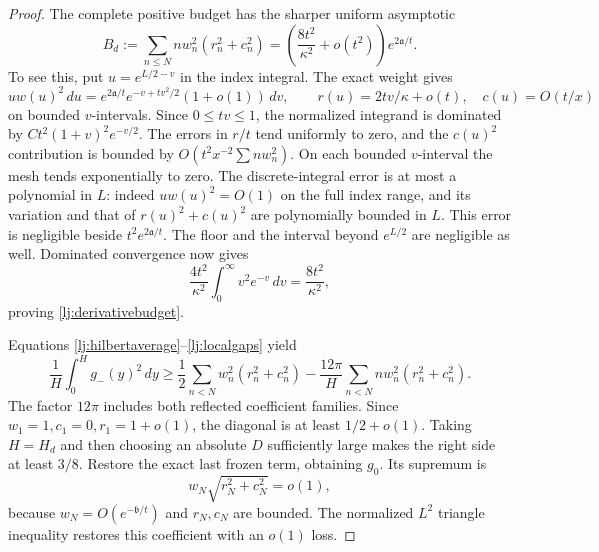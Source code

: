 \documentclass[11pt]{article}
\numberwithin{equation}{section}
\theoremstyle{definition}
\theoremstyle{remark}
\newcommand{\dd}{\,d}
\begin{document}
\begin{proof}
The complete positive budget has the sharper uniform asymptotic
\begin{equation}\label{lj:derivativebudget}
 B_d:=\sum_{n\le N}nw_n^2(r_n^2+c_n^2)
       =\left(\frac{8t^2}{\kappa^2}+o(t^2)\right)e^{2\mathfrak a/t}.
\end{equation}
To see this, put \(u=e^{L/2-v}\) in the index integral. The exact
weight gives
\[
 uw(u)^2\dd u
 =e^{2\mathfrak a/t}e^{-v+tv^2/2}(1+o(1))\dd v,
 \qquad r(u)=2tv/\kappa+o(t),\quad c(u)=O(t/x)
\]
on bounded \(v\)-intervals. Since \(0\le tv\le1\), the normalized
integrand is dominated by
\(C t^2(1+v)^2e^{-v/2}\). The errors in \(r/t\) tend uniformly to
zero, and the \(c(u)^2\) contribution is bounded by
\(O(t^2x^{-2}\sum nw_n^2)\).
On each bounded \(v\)-interval the mesh tends exponentially to zero.
The discrete-integral error is at most a polynomial in \(L\):
indeed \(uw(u)^2=O(1)\) on the full index range, and its variation
and that of \(r(u)^2+c(u)^2\) are polynomially bounded in \(L\).
This error is negligible beside \(t^2e^{2\mathfrak a/t}\).
The floor and the interval beyond \(e^{L/2}\) are negligible as well.
Dominated convergence now gives
\[
 \frac{4t^2}{\kappa^2}\int_0^\infty v^2e^{-v}\dd v
                         =\frac{8t^2}{\kappa^2},
\]
proving \eqref{lj:derivativebudget}.

Equations \eqref{lj:hilbertaverage}--\eqref{lj:localgaps} yield
\begin{equation}\label{lj:frozenpaid}
 \frac1H\int_0^Hg_-(y)^2\dd y
 \ge\frac12\sum_{n<N}w_n^2(r_n^2+c_n^2)
             -\frac{12\pi}{H}\sum_{n<N}nw_n^2(r_n^2+c_n^2).
\end{equation}
The factor \(12\pi\) includes both reflected coefficient families.
Since \(w_1=1,c_1=0,r_1=1+o(1)\), the diagonal is at least
\(1/2+o(1)\). Taking \(H=H_d\) and then choosing an absolute
\(D\) sufficiently large makes the right side at least \(3/8\).
Restore the exact last frozen term, obtaining \(g_0\). Its supremum is
\[
 w_N\sqrt{r_N^2+c_N^2}=o(1),
\]
because \(w_N=O(e^{-\mathfrak b/t})\) and \(r_N,c_N\) are bounded.
The normalized \(L^2\) triangle inequality restores this coefficient
with an \(o(1)\) loss.


\end{proof}
\end{document}
